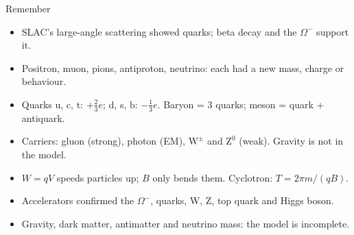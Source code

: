\begin{summarybox}{Remember}
\begin{itemize}
  \item SLAC's large-angle scattering showed quarks; beta decay and the $\Omega^-$ support it.
  \item Positron, muon, pions, antiproton, neutrino: each had a new mass, charge or behaviour.
  \item Quarks u, c, t: $+\tfrac23 e$; d, s, b: $-\tfrac13 e$. Baryon = 3 quarks; meson =
        quark + antiquark.
  \item Carriers: gluon (strong), photon (EM), $\mathrm{W}^\pm$ and $\mathrm{Z}^0$ (weak).
        Gravity is not in the model.
  \item $W = qV$ speeds particles up; $B$ only bends them. Cyclotron: $T = 2\pi m/(qB)$.
  \item Accelerators confirmed the $\Omega^-$, quarks, W, Z, top quark and Higgs boson.
  \item Gravity, dark matter, antimatter and neutrino mass: the model is incomplete.
\end{itemize}
\end{summarybox}
